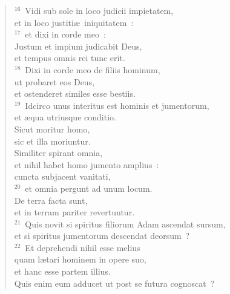 \begin{verse}${}^{16}$~Vidi sub sole in loco judicii impietatem,\\ et in loco justiti\ae\ iniquitatem~:\\
${}^{17}$~et dixi in corde meo~:\\ Justum et impium judicabit Deus,\\ et tempus omnis rei tunc erit.\\
${}^{18}$~Dixi in corde meo de filiis hominum,\\ ut probaret eos Deus,\\ et ostenderet similes esse bestiis.\\
${}^{19}$~Idcirco unus interitus est hominis et jumentorum,\\ et \ae qua utriusque conditio.\\ Sicut moritur homo,\\ sic et illa moriuntur.\\ Similiter spirant omnia,\\ et nihil habet homo jumento amplius~:\\ cuncta subjacent vanitati,\\
${}^{20}$~et omnia pergunt ad unum locum.\\ De terra facta sunt,\\ et in terram pariter revertuntur.\\
${}^{21}$~Quis novit si spiritus filiorum Adam ascendat sursum,\\ et si spiritus jumentorum descendat deorsum~?\\
${}^{22}$~Et deprehendi nihil esse melius\\ quam l\ae tari hominem in opere suo,\\ et hanc esse partem illius.\\ Quis enim eum adducet ut post se futura cognoscat~?\end{verse}


